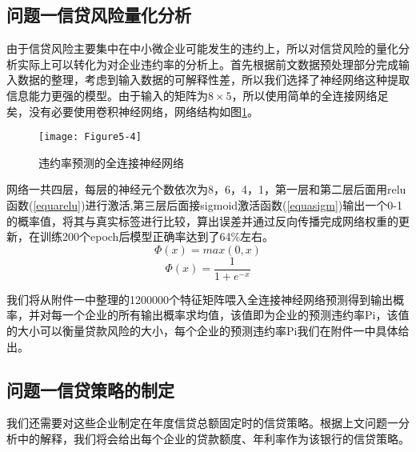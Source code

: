 \documentclass{cumcmthesis}
\begin{document}
\subsection{问题一信贷风险量化分析}
由于信贷风险主要集中在中小微企业可能发生的违约上，所以对信贷风险的量化分析实际上可以转化为对企业违约率的分析上。首先根据前文数据预处理部分完成输入数据的整理，考虑到输入数据的可解释性差，所以我们选择了神经网络这种提取信息能力更强的模型。由于输入的矩阵为$8 \times 5$，所以使用简单的全连接网络足矣，没有必要使用卷积神经网络，网络结构如图\ref{fig54}。

\begin{figure}[H]
    \centering
    \texttt{[image: Figure5-4]}
    \caption{违约率预测的全连接神经网络}
    \label{fig54}
\end{figure}

网络一共四层，每层的神经元个数依次为8，6，4，1，第一层和第二层后面用relu函数(\ref{equarelu})进行激活,第三层后面接sigmoid激活函数(\ref{equasigm})输出一个0-1的概率值，将其与真实标签进行比较，算出误差并通过反向传播完成网络权重的更新，在训练200个epoch后模型正确率达到了64\%左右。
\begin{equation}
    \Phi(x) = max(0,x)
    \label{equarelu}
\end{equation}
\begin{equation}
    \Phi(x) = \frac{1}{1+e^{-x}}
    \label{equasigm}
\end{equation}

我们将从附件一中整理的1200000个特征矩阵喂入全连接神经网络预测得到输出概率，并对每一个企业的所有输出概率求均值，该值即为企业的预测违约率Pi，该值的大小可以衡量贷款风险的大小，每个企业的预测违约率Pi我们在附件一中具体给出。

\subsection{问题一信贷策略的制定}
我们还需要对这些企业制定在年度信贷总额固定时的信贷策略。根据上文问题一分析中的解释，我们将会给出每个企业的贷款额度、年利率作为该银行的信贷策略。
\end{document}
